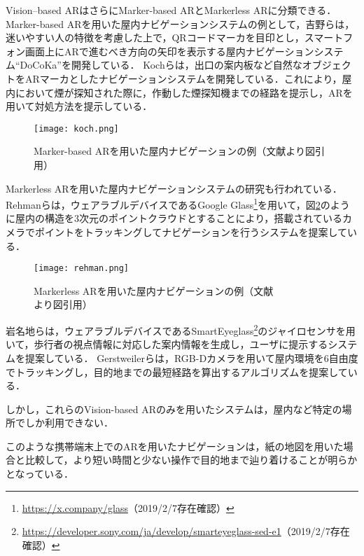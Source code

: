     Vision--based ARはさらにMarker-based ARとMarkerless ARに分類できる\cite{Rabbi:2013}．
    Marker-based ARを用いた屋内ナビゲーションシステムの例として，吉野らは，迷いやすい人の特徴を考慮した上で，QRコードマーカを目印とし，スマートフォン画面上にARで進むべき方向の矢印を表示する屋内ナビゲーションシステム``DoCoKa''を開発している\cite{Yoshino:2013}．
    Kochらは，出口の案内板など自然なオブジェクトをARマーカとしたナビゲーションシステムを開発している\cite{Koch:2014}．これにより，屋内において煙が探知された際に，作動した煙探知機までの経路を提示し，ARを用いて対処方法を提示している．
    \begin{figure}[tb]
      \centerline{\texttt{[image: koch.png]}}
      \caption{Marker-based ARを用いた屋内ナビゲーションの例（文献\cite{Koch:2014}より図引用）}
      \label{figure:koch}
    \end{figure}

    Markerless ARを用いた屋内ナビゲーションシステムの研究も行われている．
    Rehmanらは，ウェアラブルデバイスであるGoogle Glass\footnote{\url{https://x.company/glass}（2019/2/7存在確認）}を用いて，図\ref{figure:rehman}のように屋内の構造を3次元のポイントクラウドとすることにより，搭載されているカメラでポイントをトラッキングしてナビゲーションを行うシステムを提案している\cite{Rehman:2015}．
    \begin{figure}[tb]
      \centerline{\texttt{[image: rehman.png]}}
      \caption{Markerless ARを用いた屋内ナビゲーションの例（文献\cite{Rehman:2015}より図引用）}
      \label{figure:rehman}
    \end{figure}
    岩名地らは，ウェアラブルデバイスであるSmartEyeglass\footnote{\url{https://developer.sony.com/ja/develop/smarteyeglass-sed-e1}（2019/2/7存在確認）}のジャイロセンサを用いて，歩行者の視点情報に対応した案内情報を生成し，ユーザに提示するシステムを提案している\cite{Iwanaji:2016}．
    Gerstweilerらは，RGB-Dカメラを用いて屋内環境を6自由度でトラッキングし，目的地までの最短経路を算出するアルゴリズムを提案している\cite{Gerstweiler:2018}．

    しかし，これらのVision-based ARのみを用いたシステムは，屋内など特定の場所でしか利用できない．
    
    このような携帯端末上でのARを用いたナビゲーションは，紙の地図を用いた場合と比較して，より短い時間と少ない操作で目的地まで辿り着けることが明らかとなっている\cite{Rehman:2017, Yoshino:2013}．
    

